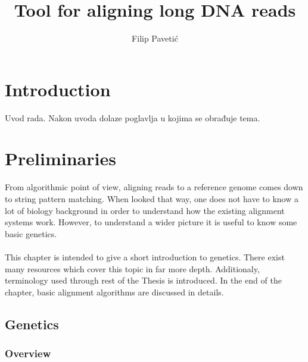 \documentclass[times, utf8, diplomski]{fer}
\begin{document}

\title{Tool for aligning long DNA reads}

\author{Filip Paveti\'{c}}

\maketitle

\izvornik

\zahvala{}

\tableofcontents

\chapter{Introduction}
Uvod rada. Nakon uvoda dolaze poglavlja u kojima se obrađuje tema.

\chapter{Preliminaries}

From algorithmic point of view, aligning reads to a reference genome comes down to string pattern matching. When looked that way, one does not have to know a lot of biology background in order to understand how the existing alignment systems work. However, to understand a wider picture it is useful to know some basic genetics. 
\\
\\
This chapter is intended to give a short introduction to genetics. There exist many resources which cover this topic in far more depth\cite{griffiths}\cite{brown}. Additionaly, terminology used through rest of the Thesis is introduced. In the end of the chapter, basic alignment algorithms are discussed in details.

\section{Genetics}
\subsection{Overview}
\end{document}
